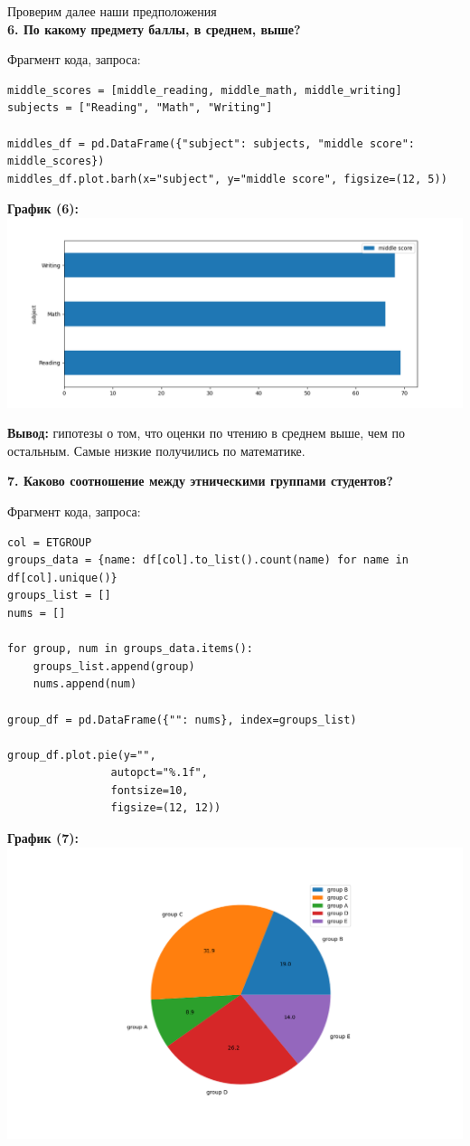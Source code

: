 \documentclass[12pt,a4paper]{article}
\begin{document}
Проверим далее наши предположения\\

\textbf{6. По какому предмету баллы, в среднем, выше?}

Фрагмент кода, запроса:
\begin{verbatim}
middle_scores = [middle_reading, middle_math, middle_writing]
subjects = ["Reading", "Math", "Writing"]

middles_df = pd.DataFrame({"subject": subjects, "middle score": middle_scores})
middles_df.plot.barh(x="subject", y="middle score", figsize=(12, 5))
\end{verbatim}

\textbf{График (6):}\\
\includegraphics[scale=0.5]{middle_score_compare.png}

\large \textbf{Вывод:} гипотезы о том, что оценки по чтению в среднем выше, чем по остальным. Самые низкие получились по математике.


\textbf{7. Каково соотношение между этническими группами студентов?}

Фрагмент кода, запроса:
\begin{verbatim}
col = ETGROUP
groups_data = {name: df[col].to_list().count(name) for name in df[col].unique()}
groups_list = []
nums = []

for group, num in groups_data.items():
    groups_list.append(group)
    nums.append(num)

group_df = pd.DataFrame({"": nums}, index=groups_list)

group_df.plot.pie(y="",
                autopct="%.1f",
                fontsize=10,
                figsize=(12, 12))
\end{verbatim}
\textbf{График (7):}\\
\includegraphics[scale=0.7]{race.png} 
\end{document}
